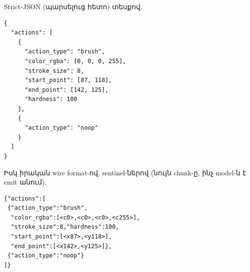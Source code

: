 \documentclass[12pt,a4paper]{report}
\newcommand{\Eng}[1]{\textenglish{#1}}
\newcommand{\TODO}[1]{\textbf{[ԼՐԱՑՆԵԼ՝ #1]}}
\begin{document}
Strict-JSON (պարսելուց հետո) տեսքով.
\begin{lstlisting}[style=code]
{
  "actions": [
    {
      "action_type": "brush",
      "color_rgba": [0, 0, 0, 255],
      "stroke_size": 8,
      "start_point": [87, 118],
      "end_point": [142, 125],
      "hardness": 100
    },
    {
      "action_type": "noop"
    }
  ]
}
\end{lstlisting}

Իսկ իրական wire format-ով, sentinel-ներով (նույն chunk-ը, ինչ model-ն է emit անում).
\begin{lstlisting}[style=code]
{"actions":[
 {"action_type":"brush",
  "color_rgba":[<c0>,<c0>,<c0>,<c255>],
  "stroke_size":8,"hardness":100,
  "start_point":[<x87>,<y118>],
  "end_point":[<x142>,<y125>]},
 {"action_type":"noop"}
]}
\end{lstlisting}



\end{document}
